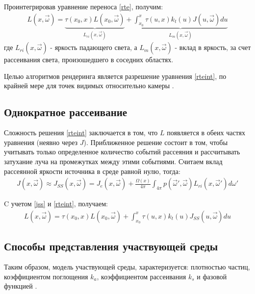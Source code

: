 Проинтегрировав уравнение переноса \ref{rte}, получим:
\begin{equation}
	\label{rteint}
	\begin{aligned}
		L(x, \vec{\omega}) =
		\underbrace{\tau(x_0, x) L(x_0, \vec{\omega})}_{L_{ri}(x, \vec{\omega})} + \underbrace{\int_{x_0}^{x} \tau(u, x) k_t(u) J(u, \vec{\omega}) du}_{L_m(x, \vec{\omega})}
	\end{aligned}
\end{equation}
где $ L_{ri}(x, \vec{\omega}) $ - яркость падающего света, а $ L_m(x, \vec{\omega}) $ - вклад в яркость, за счет рассеивания света, произошедшего в соседних областях. 

Целью алгоритмов рендеринга является разрешение уравнения \ref{rteint}, по крайней мере для точек видимых относительно камеры \cite{partmedia}. 

\subsection{Однократное рассеивание}

Сложность решения \ref{rteint} заключается в том, что $L$ появляется в обеих частях уравнения (неявно через $J$). Приближенное решение состоит в том, чтобы учитывать только определенное количество событий рассеяния и рассчитывать затухание луча на промежутках между этими событиями. Считаем вклад рассеянной яркости источника в среде равной нулю, тогда:
\begin{equation}
	\label{jss}
	\begin{aligned}
		J(x, \vec{\omega}) \approx J_{SS}(x, \vec{\omega}) = J_e(x, \vec{\omega}) + \frac{\Omega(x)}{4\pi} \int_{4\pi} p(\vec{\omega}', \vec{\omega}) L_{ri}(x, \vec{\omega}') d\omega'
	\end{aligned}
\end{equation}

C учетом \ref{jss} и \ref{rteint}, получаем:
\begin{equation}
	\label{rteintss}
	\begin{aligned}
		L(x, \vec{\omega}) =
		\tau(x_0, x) L(x_0, \vec{\omega}) + \int_{x_0}^{x} \tau(u, x) k_t(u) J_{SS}(u, \vec{\omega}) du
	\end{aligned}
\end{equation}

\subsection{Способы представления участвующей среды}
Таким образом, модель участвующей среды, характеризуется: плотностью частиц, коэффициентом поглощения $k_a$, коэффициентом рассеивания $k_s$ и фазовой функцией \cite{clouds}.

